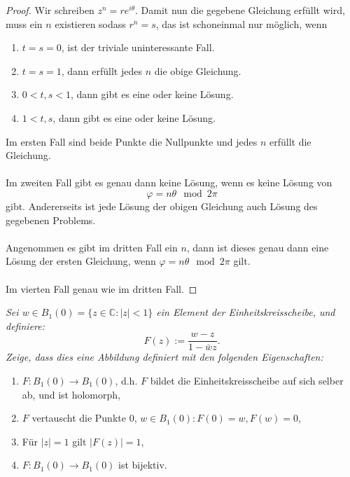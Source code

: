 \documentclass[11pt]{article}
\newcommand{\C}{\mathbb{C}}
\newenvironment{problem}[2][Beispiel]{
    \begin{trivlist}
        \item[\hskip \labelsep {\bfseries #1}\hskip \labelsep {\bfseries #2.}] \itshape}{
    \end{trivlist}\normalshape
}
\begin{document}
    \begin{proof}
        Wir schreiben $z^n = re^{i\theta}$. Damit nun die gegebene Gleichung
        erfüllt wird, muss ein $n$ existieren sodass $r^n =s$, das ist schoneinmal
        nur möglich, wenn
        \begin{enumerate}[label = (\roman{enumi})]
            \item $t=s=0$, ist der triviale uninteressante Fall.
            \item $t=s=1$, dann erfüllt jedes $n$ die obige Gleichung.
            \item $0<t,s<1$, dann gibt es eine oder keine Lösung.
            \item $1<t,s$, dann gibt es eine oder keine Lösung.
        \end{enumerate}
        Im ersten Fall sind beide Punkte die Nullpunkte und jedes $n$ erfüllt die
        Gleichung. \\\\
        Im zweiten Fall gibt es genau dann keine Lösung, wenn es keine
        Lösung von
        $$\varphi = n\theta\mod 2\pi$$
        gibt. Andererseits ist jede Lösung der obigen Gleichung auch Lösung
        des gegebenen Problems. \\\\
        Angenommen es gibt im dritten Fall ein $n$, dann ist dieses genau dann
        eine Lösung der ersten Gleichung, wenn $\varphi = n\theta\mod 2\pi$ gilt. \\\\
        Im vierten Fall genau wie im dritten Fall.
    \end{proof}

    \begin{problem}{3}
        Sei $w\in B_1(0)=\{z\in\C:|z|<1\}$ ein Element der Einheitskreisscheibe,
        und definiere:
        $$F(z):= \dfrac{w-z}{1-\bar{w}z}.$$
        Zeige, dass dies eine Abbildung definiert mit den folgenden Eigenschaften:
        \begin{enumerate}[label=(\alph*)]
            \item $F:B_1(0)\to B_1(0)$, d.h. $F$ bildet die Einheitskreisscheibe
            auf sich selber ab, und ist holomorph,
            \item $F$ vertauscht die Punkte $0$, $w\in B_1(0): F(0)=w,F(w)=0$,
            \item Für $|z|=1$ gilt $|F(z)|=1$,
            \item $F:B_1(0)\to B_1(0)$ ist bijektiv.
        \end{enumerate}
    \end{problem}
\end{document}
